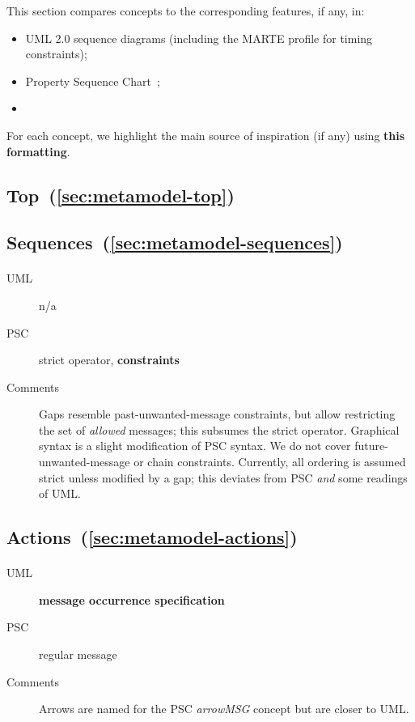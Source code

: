 \newcommand{\insp}[1]{\textbf{#1}}

This section compares \langname{} concepts to the
corresponding features, if any, in:

\begin{itemize}
\item
  UML 2.0 sequence diagrams (including the MARTE profile for timing
  constraints);
\item
  Property Sequence Chart~\cite{psc};
\item
\end{itemize}

For each concept, we highlight the main source of inspiration (if any)
using \insp{this formatting}.

\subsection{Top~(\ref{sec:metamodel-top})}

\subsection{Sequences~(\ref{sec:metamodel-sequences})}

\paragraph{\msequencegap}
\begin{description}
\item[UML] n/a
\item[PSC] strict operator, \insp{constraints}
\item[Comments]
  Gaps resemble past-unwanted-message constraints, but
  allow restricting the set of \emph{allowed} messages;
  this subsumes the strict operator.  Graphical syntax is a slight
  modification of PSC syntax.  We do not cover
  future-unwanted-message or chain constraints.  Currently, all
  ordering is assumed strict unless modified by a gap; this
  deviates from PSC \emph{and} some readings of UML.
\end{description}
    
\subsection{Actions~(\ref{sec:metamodel-actions})}

\paragraph{\marrowaction}
\begin{description}
\item[UML] \insp{message occurrence specification}
\item[PSC] regular message
\item[Comments]
  Arrows are named for the PSC \emph{arrowMSG} concept but are closer
  to UML.
\end{description}

